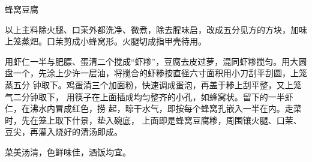 \begin{recipe}{蜂窝豆腐}

\ingredients


\preparation

\step 以上主料除火腿、口茉外都洗净、微煮，除去腥味启，改成五分见方的方块，加味
上笼蒸𤆵。口茉剪成小蜂窝形。火腿切成指甲壳待用。

\step 用虾仁一半与肥膘、蛋清二个搅成“虾糁”，豆腐去皮过萝，混同虾糁搅匀。用大圆
盘一个，先涂上少许一层油，将搅合的虾糁按直径六寸面积用小刀刮平刮圆，上笼蒸五分
钟取下。鸡蛋清三个加面粉，快速调成蛋泡，再盖于糁上刮平整，又上笼气二分钟取下，
用筷子在上面插成均匀整齐的小孔，如蜂窝状。留下的一半虾仁，在沸水内冒成红色，捞
起，晾干水气，即按每个蜂窝孔嵌入一半在内。走菜时，先在笼上取下什景，垫入碗底，
上面即是蜂窝豆腐糁，周围镶火腿、口茉、豆尖，再灌入烧好的清汤即成。

\features

菜美汤清，色鲜味佳，酒饭均宜。

\end{recipe}

